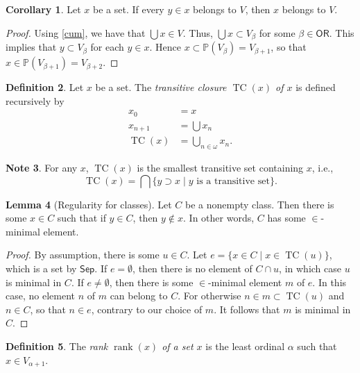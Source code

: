 \documentclass[10pt,letterpaper,cm]{nupset}
\theoremstyle{definition}
\newtheorem{definition}{Definition}[subsection]
\newtheorem{note}[definition]{Note}
\theoremstyle{theorem}
\newtheorem{lemma}[definition]{Lemma}
\newtheorem{corollary}[definition]{Corollary}
\theoremstyle{remark}
\renewcommand{\P}{\mathbb P}
\newcommand{\1}{\mathbf{1}}
\newcommand{\0}{\vec 0}
\newcommand{\ord}{\mathsf{OR}}
\DeclareMathOperator{\rnk}{rank}
\DeclareMathOperator{\tc}{TC}
\begin{document}
\begin{corollary}
Let $x$ be a set. If every $y\in x$ belongs to $V$, then $x$ belongs to $V$. 
\end{corollary}
\begin{proof}
Using \cref{cum}, we have that $\bigcup{x} \in V$. Thus, $\bigcup{x}\subset V_{\beta}$ for some $\beta \in \ord$. This implies that $y \subset V_{\beta}$ for each $y\in x$. Hence $x\subset \P(V_{\beta}) = V_{\beta +1}$, so that $x \in \P(V_{\beta +1}) = V_{\beta +2}$.
\end{proof}

\begin{definition}
Let $x$ be a set. The \textit{transitive closure $\tc(x)$ of $x$} is defined recursively by
\begin{align*}
x_0 & = x
 \\ x_{n+1} & = \bigcup {x_n}
 \\ \tc(x) & = \bigcup_{n\in \omega} x_n.
\end{align*}
\end{definition}

\begin{note}
For any $x$, $\tc(x)$ is the smallest transitive set containing $x$, i.e., $$\tc(x) = \bigcap{\{y\supset x \mid y \text{ is a transitive set}\}}.$$
\end{note}

\begin{lemma}[Regularity for classes]\label{reg}
Let $C$ be a nonempty class. Then there is some $x\in C$ such that if $y\in C$, then $y \notin x$. In other words, $C$ has some $\in$-minimal element.
\end{lemma}
\begin{proof}
By assumption, there is some $u\in C$. Let $e = \{ x\in C \mid x \in \tc(u)\}$, which is a set by $\mathsf{Sep}$. If $e = \emptyset$, then there is no element of $C \cap u$, in which case $u$ is minimal in $C$. If $e\ne \emptyset$, then there is some $\in$-minimal element $m$ of $e$. In this case, no element $n$ of $m$ can belong to $C$. For otherwise $n\in m\subset \tc(u)$ and $n \in C$, so that $n \in e$, contrary to our choice of $m$. It follows that $m$ is minimal in $C$.
\end{proof}

\begin{definition}
The \textit{rank $\rnk(x)$ of a set $x$} is the least ordinal $\alpha$ such that $x\in V_{\alpha +1}$.
\end{definition}
\end{document}
